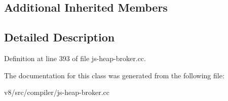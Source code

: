 \subsection*{Additional Inherited Members}


\subsection{Detailed Description}


Definition at line 393 of file js-\/heap-\/broker.\+cc.



The documentation for this class was generated from the following file\+:\begin{DoxyCompactItemize}
\item 
v8/src/compiler/js-\/heap-\/broker.\+cc\end{DoxyCompactItemize}
